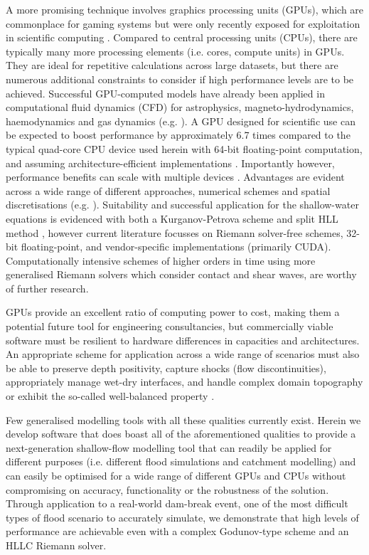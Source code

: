 \documentclass[11pt,english,a4paper]{article}
\begin{document}
A more promising technique involves graphics processing units (GPUs), which are commonplace for gaming systems but were only recently exposed for exploitation in scientific computing \cite{Owens_07,Nickolls_10}. Compared to central processing units (CPUs), there are typically many more processing elements (i.e. cores, compute units) in GPUs. They are ideal for repetitive calculations across large datasets, but there are numerous additional constraints to consider if high performance levels are to be achieved. Successful GPU-computed models have already been applied in computational fluid dynamics (CFD) for astrophysics, magneto-hydrodynamics, haemodynamics and gas dynamics (e.g. \cite{Bisson_12}). A GPU designed for scientific use can be expected to boost performance by approximately 6.7 times compared to the typical quad-core CPU device used herein with 64-bit floating-point computation, and assuming architecture-efficient implementations \cite{Intel_12,NVIDIA_11}. Importantly however, performance benefits can scale with multiple devices \cite{Kuo_11,Saetra_12}. Advantages are evident across a wide range of different approaches, numerical schemes and spatial discretisations (e.g. \cite{Kuo_11,Horvath_10,Wang_10,Rossinelli_11,Schive_11,Crespo_11}). Suitability and successful application for the shallow-water equations is evidenced with both a Kurganov-Petrova scheme and split HLL method \cite{Brodtkorb_10,Brodtkorb_10a,Brodtkorb_11,Saetra_12,Kuo_11}, however current literature focusses on Riemann solver-free schemes, 32-bit floating-point, and vendor-specific implementations (primarily CUDA). Computationally intensive schemes of higher orders in time using more generalised Riemann solvers which consider contact and shear waves, are worthy of further research. 

GPUs provide an excellent ratio of computing power to cost, making them a potential future tool for engineering consultancies, but commercially viable software must be resilient to hardware differences in capacities and architectures. An appropriate scheme for application across a wide range of scenarios must also be able to preserve depth positivity, capture shocks (flow discontinuities), appropriately manage wet-dry interfaces, and handle complex domain topography or exhibit the so-called well-balanced property \cite{Xing_10,Murillo_10}. 

Few generalised modelling tools with all these qualities currently exist. Herein we develop software that does boast all of the aforementioned qualities to provide a next-generation shallow-flow modelling tool that can readily be applied for different purposes (i.e. different flood simulations and catchment modelling) and can easily be optimised for a wide range of different GPUs and CPUs without compromising on accuracy, functionality or the robustness of the solution. Through application to a real-world dam-break event, one of the most difficult types of flood scenario to accurately simulate, we demonstrate that high levels of performance are achievable even with a complex Godunov-type scheme and an HLLC Riemann solver. 
\end{document}
